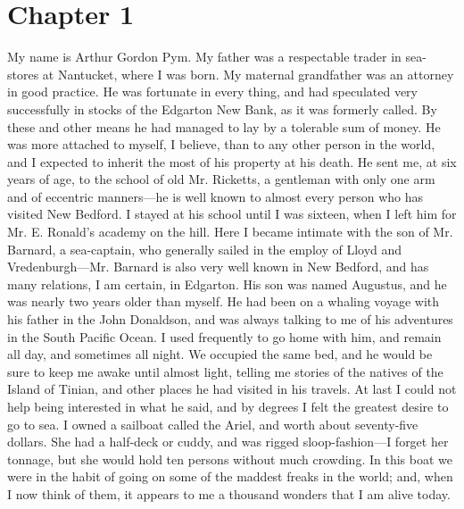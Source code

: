 \section{Chapter 1}
My name is Arthur Gordon Pym. My father was a respectable trader in
sea-stores at Nantucket, where I was born. My maternal grandfather was an
attorney in good practice. He was fortunate in every thing, and had speculated
very successfully in stocks of the Edgarton New Bank, as it was formerly called.
By these and other means he had managed to lay by a tolerable sum of money. He
was more attached to myself, I believe, than to any other person in the world,
and I expected to inherit the most of his property at his death. He sent me, at
six years of age, to the school of old Mr. Ricketts, a gentleman with only one
arm and of eccentric manners---he is well known to almost every person who has
visited New Bedford. I stayed at his school until I was sixteen, when I left him
for Mr. E. Ronald's academy on the hill. Here I became intimate with the son of
Mr. Barnard, a sea-captain, who generally sailed in the employ of Lloyd and
Vredenburgh---Mr. Barnard is also very well known in New Bedford, and has many
relations, I am certain, in Edgarton. His son was named Augustus, and he was
nearly two years older than myself. He had been on a whaling voyage with his
father in the John Donaldson, and was always talking to me of his adventures in
the South Pacific Ocean. I used frequently to go home with him, and remain all
day, and sometimes all night. We occupied the same bed, and he would be sure to
keep me awake until almost light, telling me stories of the natives of the
Island of Tinian, and other places he had visited in his travels. At last I
could not help being interested in what he said, and by degrees I felt the
greatest desire to go to sea. I owned a sailboat called the Ariel, and worth
about seventy-five dollars. She had a half-deck or cuddy, and was rigged
sloop-fashion---I forget her tonnage, but she would hold ten persons without
much crowding. In this boat we were in the habit of going on some of the maddest
freaks in the world; and, when I now think of them, it appears to me a thousand
wonders that I am alive today. 

